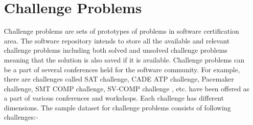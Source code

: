 \documentclass[11pt,letterpaper]{report}
\begin{document}
\chapter{Challenge Problems}

Challenge problems are sets of prototypes of problems in software certification area. The software repository intends to store all the available and relevant challenge problems including both solved and unsolved challenge problems meaning that the solution is also saved if it is available. Challenge problems can be a part of several conferences held for the software community. For example, there are challenges called SAT challenge, CADE ATP  challenge, Pacemaker challenge, SMT COMP challenge, SV-COMP challenge \cite{SAT,CADE,Pacemaker,SMT,SV}, etc. have been offered as a part of various conferences and workshops. Each challenge has different dimensions. The sample dataset for challenge problems consists of following challenges:- 
\end{document}
